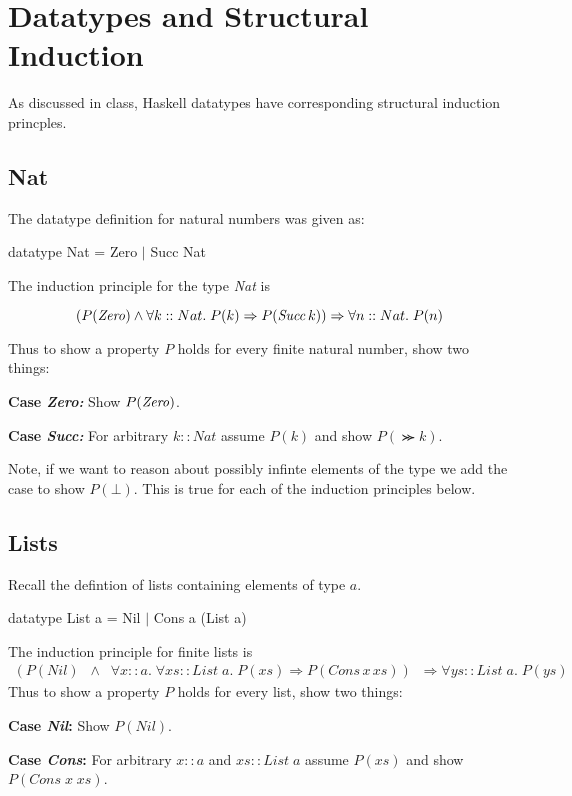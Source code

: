 \documentclass[11pt]{article}
\begin{document}


\section{Datatypes and Structural Induction}

As discussed in class, Haskell datatypes have corresponding structural induction princples. 

\subsection{Nat}

The datatype definition for natural numbers was given as:\\

\begin{program**}
\> datatype Nat = Zero $\mid$ Succ Nat \\
\end{program**}

\goodbreak\noindent{}The induction principle for the type {\it{Nat}} is 

\[(P({\mathit{Zero}}) \wedge \forall{}k::Nat.\;P(k) \Rightarrow P({\mathit{Succ\,}}{}k)) \Rightarrow \forall{}n::Nat.\;P(n)\]

Thus to show a property $P$ holds for every finite natural number, show two things:
\begin{description}
\item{\bf{Case} \it{Zero}:}   Show $P({\mathit{Zero}})$.\vspace{-.5em}
\item{\bf{Case} \it{Succ}:}  For arbitrary $k::Nat$ assume $P(k)$ and show $P(\Succ{}k)$.
\end{description}

Note, if we want to reason about possibly infinte elements of the type we add
the case to show $P(\bot)$. This is true for each of the induction principles
below.

\subsection{Lists}

Recall the defintion of lists containing elements of type $a$.
\begin{program**}
\> datatype  List a = Nil $\mid$  Cons a (List a)
\end{program**}
The induction principle for finite lists is \[\begin{array}{l}
(P({\mathit{Nil}}) \;\;\wedge\;\; \forall{}x::a.\;\forall{}xs:: List\; a. \; P(xs) \Rightarrow P({\mathit{Cons}} \,x\,xs))  \;\; \Rightarrow \forall{}ys:: List\; a.\; P(ys)
\end{array}\]
Thus to show a property $P$ holds for every list, show two things:
\begin{description}
\item{\bf{Case} {\it{Nil}}:}  Show $P({\mathit{Nil}})$.\vspace{-.5em}
\item{\bf{Case} {\it{Cons}}:} For arbitrary $x::a$ and $xs:: List \;a$ assume $P(xs)$
and show $P({\mathit{Cons}}\;x\;xs)$.
\end{description}
\end{document}
